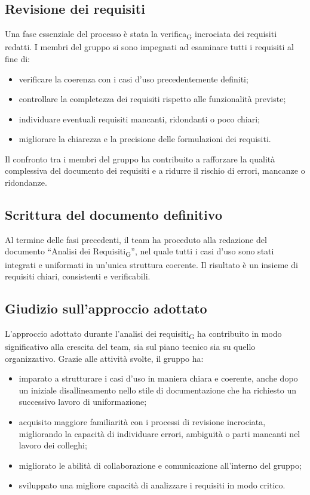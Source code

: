 \documentclass[11pt,a4paper]{article}
\newcommand{\gls}[1]{#1\textsubscript{G}}
\begin{document}
\subsection{Revisione dei requisiti}
Una fase essenziale del processo è stata la \gls{verifica} incrociata dei requisiti redatti. I membri del gruppo si sono impegnati ad esaminare tutti i requisiti al fine di:
\begin{itemize}
\item verificare la coerenza con i casi d’uso precedentemente definiti;
\item controllare la completezza dei requisiti rispetto alle funzionalità previste;
\item individuare eventuali requisiti mancanti, ridondanti o poco chiari;
\item migliorare la chiarezza e la precisione delle formulazioni dei requisiti.
\end{itemize}
Il confronto tra i membri del gruppo ha contribuito a rafforzare la qualità complessiva del documento dei requisiti e a ridurre il rischio di errori, mancanze o ridondanze.

\subsection{Scrittura del documento definitivo}
Al termine delle fasi precedenti, il team ha proceduto alla redazione del documento “\gls{Analisi dei Requisiti}”, nel quale tutti i casi d’uso sono stati integrati e uniformati in un’unica struttura coerente. Il risultato è un insieme di requisiti chiari, consistenti e verificabili.

\subsection{Giudizio sull'approccio adottato}
L’approccio adottato durante l’\gls{analisi dei requisiti} ha contribuito in modo significativo alla crescita del team, sia sul piano tecnico sia su quello organizzativo. Grazie alle attività svolte, il gruppo ha:
\begin{itemize}
\item imparato a strutturare i casi d’uso in maniera chiara e coerente, anche dopo un iniziale disallineamento nello stile di documentazione che ha richiesto un successivo lavoro di uniformazione;
\item acquisito maggiore familiarità con i processi di revisione incrociata, migliorando la capacità di individuare errori, ambiguità o parti mancanti nel lavoro dei colleghi;
\item migliorato le abilità di collaborazione e comunicazione all'interno del gruppo;
\item sviluppato una migliore capacità di analizzare i requisiti in modo critico.
\end{itemize}
\end{document}
